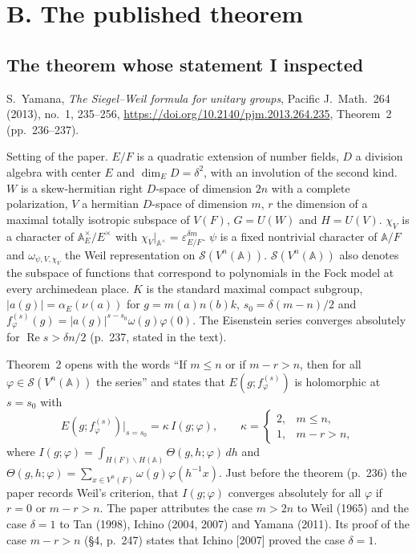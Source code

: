 \documentclass[11pt]{article}
\theoremstyle{definition}
\begin{document}
\section{B. The published theorem}\label{sec:source}

\subsection{The theorem whose statement I inspected}

S.~Yamana, \emph{The Siegel--Weil formula for unitary groups}, Pacific J.\ Math.\ 264 (2013), no.~1, 235--256, \url{https://doi.org/10.2140/pjm.2013.264.235}, Theorem~2 (pp.~236--237).

Setting of the paper. $E/F$ is a quadratic extension of number fields, $D$ a division algebra with center $E$ and $\dim_ED=\delta^2$, with an involution of the second kind. $W$ is a skew-hermitian right $D$-space of dimension $2n$ with a complete polarization, $V$ a hermitian $D$-space of dimension $m$, $r$ the dimension of a maximal totally isotropic subspace of $V(F)$, $G=U(W)$ and $H=U(V)$. $\chi_V$ is a character of $\mathbb A_E^\times/E^\times$ with $\chi_V|_{\mathbb A^\times}=\varepsilon_{E/F}^{\delta m}$. $\psi$ is a fixed nontrivial character of $\mathbb A/F$ and $\omega_{\psi,V,\chi_V}$ the Weil representation on $\mathcal S(V^n(\mathbb A))$. $\mathcal S(V^n(\mathbb A))$ also denotes the subspace of functions that correspond to polynomials in the Fock model at every archimedean place. $K$ is the standard maximal compact subgroup, $|a(g)|=\alpha_E(\nu(a))$ for $g=m(a)n(b)k$, $s_0=\delta(m-n)/2$ and $f_\varphi^{(s)}(g)=|a(g)|^{s-s_0}\omega(g)\varphi(0)$. The Eisenstein series converges absolutely for $\operatorname{Re}s>\delta n/2$ (p.~237, stated in the text).

Theorem~2 opens with the words ``If $m\le n$ or if $m-r>n$, then for all $\varphi\in\mathcal S(V^n(\mathbb A))$ the series'' and states that $E(g;f_\varphi^{(s)})$ is holomorphic at $s=s_0$ with
\[
E(g;f_\varphi^{(s)})\big|_{s=s_0}=\kappa\,I(g;\varphi),\qquad \kappa=\begin{cases}2,&m\le n,\\1,&m-r>n,\end{cases}
\]
where $I(g;\varphi)=\int_{H(F)\backslash H(\mathbb A)}\Theta(g,h;\varphi)\,dh$ and $\Theta(g,h;\varphi)=\sum_{x\in V^n(F)}\omega(g)\varphi(h^{-1}x)$. Just before the theorem (p.~236) the paper records Weil's criterion, that $I(g;\varphi)$ converges absolutely for all $\varphi$ if $r=0$ or $m-r>n$. The paper attributes the case $m>2n$ to Weil (1965) and the case $\delta=1$ to Tan (1998), Ichino (2004, 2007) and Yamana (2011). Its proof of the case $m-r>n$ (§4, p.~247) states that Ichino [2007] proved the case $\delta=1$.
\end{document}
